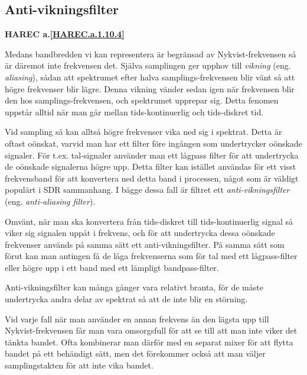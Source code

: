 \subsection{Anti-vikningsfilter}
\textbf{HAREC a.\ref{HAREC.a.1.10.4}\label{myHAREC.a.1.10.4}}

\begin{rev-nytt}[MAD]

Medans bandbredden vi kan representera är begränsad av Nykvist-frekvensen så
är däremot inte frekvensen det. Själva samplingen ger upphov till
\emph{vikning} (eng. \emph{aliasing}),
sådan att spektrumet efter halva samplings-frekvensen blir vänt så att högre
frekvenser blir lägre. Denna vikning vänder sedan igen när frekvensen blir
den hos samplings-frekvensen, och spektrumet upprepar sig. Detta fenomen
uppstår alltid när man går mellan tids-kontinuerlig och tids-diskret tid.


Vid sampling så kan alltså högre frekvenser vika ned sig i spektrat. Detta är
oftast oönskat, varvid man har ett filter före ingången som undertrycker
oönskade signaler. För t.ex. tal-signaler använder man ett lågpass filter för
att undertrycka de oönskade signalerna högre upp. Detta filter kan istället
användas för ett visst frekvensband för att konvertera ned detta band i
processen, något som är väldigt populärt i SDR sammanhang. I bägge dessa fall
är filtret ett \emph{anti-vikningsfilter} (eng. \emph{anti-aliasing filter}).

Omvänt, när man ska konvertera från tids-diskret till tids-kontinuerlig
signal så viker sig signalen uppåt i frekvens, och för att undertrycka dessa
oönskade frekvenser används på samma sätt ett anti-vikningsfilter. På samma
sätt som förut kan man antingen få de låga frekvenserna som för tal med ett
lågpass-filter eller högre upp i ett band med ett lämpligt bandpass-filter.

Anti-vikningsfilter kan många gånger vara relativt branta, för de måste
undertrycka andra delar av spektrat så att de inte blir en störning.

Vid varje fall när man använder en annan frekvens än den lägsta upp till
Nykvist-frekvensen får man vara omsorgsfull för att se till att man inte viker
det tänkta bandet. Ofta kombinerar man därför med en separat mixer för att
flytta bandet på ett behändigt sätt, men det förekommer också att man väljer
samplingstakten för att inte vika bandet.

\end{rev-nytt}

